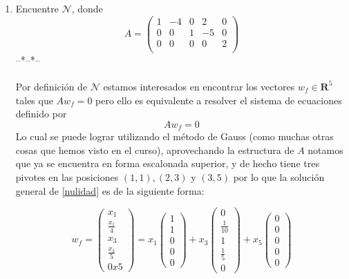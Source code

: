 \documentclass[letter]{memoir} %
\begin{document}
\begin{enumerate}
\item Encuentre $\mathcal{N}$, donde 
	\[
			A= \left( 
            \begin{array}{ccccc}
            1 & -4 & 0 & 2 & 0\\
            0 & 0  & 1 & -5& 0 \\
            0 & 0  & 0 & 0 & 2\\
			\end{array}
					\right)
		\]
--*--*--\\\\
Por definición de $\mathcal{N}$ estamos interesados en encontrar los vectores $w_f\in \mathbf{R}^5$ tales que $Aw_f=0$ pero ello es equivalente a resolver el sistema de ecuaciones definido por 
\begin{equation}\label{nulidad}
Aw_f = 0
\end{equation}
Lo cual se puede lograr utilizando el método de Gauss (como muchas otras cosas que hemos visto en el curso), aprovechando la estructura de $A$ notamos que ya se encuentra en forma escalonada superior, y de hecho tiene tres pivotes en las posiciones $(1,1),(2,3)$ y $(3,5)$ por lo que la solución  general de \ref{nulidad} es de la siguiente forma:

\[
w_f = \left( \begin{array}{c}
				x_1\\ \frac{x_1}{4}\\ x_3\\ \frac{x_3}{5} \\ 0x5
			\end{array} \right) =
            x_1\left( \begin{array}{c}
				1 \\ 1 \\ 0 \\ 0\\ 0
			\end{array} \right) + 
            x_3\left( \begin{array}{c}
				0 \\ \frac{1}{10} \\ 1 \\ \frac{1}{5} \\ 0
			\end{array} \right) + 
            x_5\left( \begin{array}{c}
				0 \\ 0 \\ 0 \\ 0 \\ 0
			\end{array} \right)            
\]


\end{enumerate}
\end{document}
